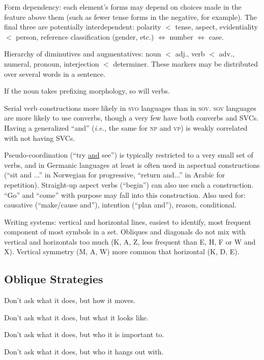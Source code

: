 \documentclass[11pt]{article}
\newcommand{\I}[1]{\textsc{#1}}   %
\begin{document}
Form dependency: each element's forms may depend on choices made in
the feature above them (such as fewer tense forms in the negative, for
example).  The final three are potentially interdependent: polarity
$<$ tense, aspect, evidentiality $<$ person, reference classification
(gender, etc.) $\Leftrightarrow$ number $\Leftrightarrow$ case.

Hierarchy of diminutives and augmentatives: noun $<$ adj., verb $<$
adv., numeral, pronoun, interjection $<$ determiner.  These markers
may be distributed over several words in a sentence.

If the noun takes prefixing morphology, so will verbs.

Serial verb constructions more likely in \I{svo} languages than in
\I{sov}.  \I{sov} languages are more likely to use converbs, though a
very few have both converbs and SVCs.  Having a generalized ``and''
(\textit{i.e.,} the same for \I{np} and \I{vp}) is weakly correlated
with not having SVCs.

Pseudo-coordination (``try \uline{and} see'') is typically restricted
to a very small set of verbs, and in Germanic languages at least is
often used in aspectual constructions (``sit and ...'' in Norwegian
for progressive, ``return and...'' in Arabic for repetition).
Straight-up aspect verbs (``begin'') can also use such a
construction. ``Go'' and ``come'' with purpose may fall into this
construction.  Also used for: causative (``make/cause and''),
intention (``plan and''), reason, conditional.

Writing systems: vertical and horizontal lines, easiest to identify,
most frequent component of most symbols in a set. Obliques and
diagonals do not mix with vertical and horizontals too much (K, A, Z,
less frequent than E, H, F or W and X). Vertical symmetry (M, A, W)
more common that horizontal (K, D, E).

\subsection{Oblique Strategies}
Don't ask what it does, but how it moves.

Don't ask what it does, but what it looks like.

Don't ask what it does, but who it is important to.

Don't ask what it does, but who it hangs out with.
\end{document}
